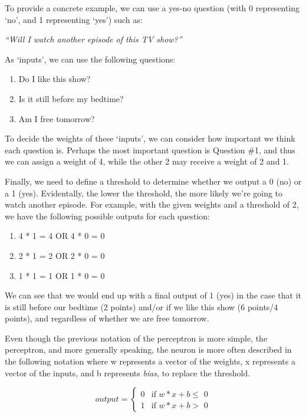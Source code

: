 \documentclass
[
    a4paper,
    twoside,
    12pt,
]
{report}
\begin{document}
To provide a concrete example, we can use a yes-no question (with 0
representing `no', and 1 representing `yes') such as:

\emph{``Will I watch another episode of this TV show?''}

As `inputs', we can use the following questions:

\begin{enumerate}
\def\labelenumi{\arabic{enumi}.}
\tightlist
\item
  Do I like this show?
\item
  Is it still before my bedtime?
\item
  Am I free tomorrow?
\end{enumerate}

To decide the weights of these `inputs', we can consider how important
we think each question is. Perhaps the most important question is
Question \#1, and thus we can assign a weight of 4, while the other 2
may receive a weight of 2 and 1.

Finally, we need to define a threshold to determine whether we output a
0 (no) or a 1 (yes). Evidentally, the lower the threshold, the more
likely we're going to watch another episode. For example, with the given
weights and a threshold of 2, we have the following possible outputs for
each question:

\begin{enumerate}
\def\labelenumi{\arabic{enumi}.}
\tightlist
\item
  4 * 1 = 4 OR 4 * 0 = 0
\item
  2 * 1 = 2 OR 2 * 0 = 0
\item
  1 * 1 = 1 OR 1 * 0 = 0
\end{enumerate}

We can see that we would end up with a final output of 1 (yes) in the
case that it is still before our bedtime (2 points) and/or if we like
this show (6 points/4 points), and regardless of whether we are free
tomorrow.

Even though the previous notation of the perceptron is more simple, the
perceptron, and more generally speaking, the neuron is more often
described in the following notation where w represents a vector of the
weights, x represents a vector of the inputs, and b represents
\emph{bias}, to replace the threshold.

\begin{equation*}
    output=\begin{cases}
        0 & \text{if $w * x + b \leq$ 0} \\
        1 & \text{if $w * x + b >$ 0}
    \end{cases}
\end{equation*}
\end{document}
